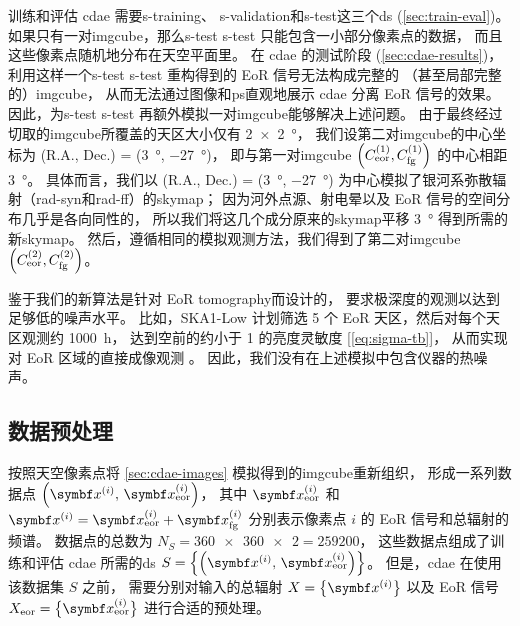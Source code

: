 训练和评估 \ac{cdae} 需要\acl{s-training}、
\acl{s-validation}和\acl{s-test}这三个\ac{ds} (\autoref{sec:train-eval})。
如果只有一对\ac{imgcube}，那么\acl{s-test} \ac{s-test} 只能包含一小部分像素点的数据，
而且这些像素点随机地分布在天空平面里。
在 \ac{cdae} 的测试阶段 (\autoref{sec:cdae-results})，
利用这样一个\acl{s-test} \ac{s-test} 重构得到的 EoR 信号无法构成完整的
（甚至局部完整的）\ac{imgcube}，
从而无法通过图像和\ac{ps}直观地展示 \ac{cdae} 分离 EoR 信号的效果。
因此，为\acl{s-test} \ac{s-test} 再额外模拟一对\ac{imgcube}能够解决上述问题。
由于最终经过切取的\ac{imgcube}所覆盖的天区大小仅有 \SI{2 x 2}{\degree}，
我们设第二对\ac{imgcube}的中心坐标为
(R.A., Dec.\@) = (\SI{3}{\degree}, \SI{-27}{\degree})，
即与第一对\ac{imgcube}
$\left( C_{\mathrm{eor}}^{(1)}, C_{\mathrm{fg}}^{(1)} \right)$
的中心相距 \SI{3}{\degree}。
具体而言，我们以 (R.A., Dec.\@) = (\SI{3}{\degree}, \SI{-27}{\degree})
为中心模拟了银河系弥散辐射（\ac{rad-syn}和\ac{rad-ff}）的\ac{skymap}；
因为河外点源、射电晕以及 EoR 信号的空间分布几乎是各向同性的，
所以我们将这几个成分原来的\ac{skymap}平移 \SI{3}{\degree} 得到所需的新\ac{skymap}。
然后，遵循相同的模拟观测方法，我们得到了第二对\ac{imgcube}
$\left( C_{\mathrm{eor}}^{(2)}, C_{\mathrm{fg}}^{(2)} \right)$。

鉴于我们的新算法是针对 EoR \ac{tomography}而设计的，
要求极深度的观测以达到足够低的噪声水平。
比如，SKA1-Low 计划筛选 5 个 EoR 天区，然后对每个天区观测约 \SI{1000}{\hour}，
达到空前的约小于 \SI{1}{\mK} 的亮度灵敏度 [\autoref{eq:sigma-tb}]，
从而实现对 EoR 区域的直接成像观测 \cite{mellema2013,mellema2015,koopmans2015}。
因此，我们没有在上述模拟中包含仪器的热噪声。

\subsection{数据预处理}
\label{sec:preprocessing}

按照天空像素点将 \autoref{sec:cdae-images} 模拟得到的\ac{imgcube}重新组织，
形成一系列数据点 $\left( \B{x}^{(i)}, \,\B{x}^{(i)}_{\R{eor}} \right)$，
其中 $\B{x}^{(i)}_{\R{eor}}$ 和
$\B{x}^{(i)} = \B{x}^{(i)}_{\R{eor}} + \B{x}^{(i)}_{\R{fg}}$
分别表示像素点 $i$ 的 EoR 信号和总辐射的频谱。
数据点的总数为 $N_S = \num{360x360 x 2} = \num{259200}$，
这些数据点组成了训练和评估 \ac{cdae} 所需的\ac{ds}
$S = \left\{ \left(\B{x}^{(i)}, \,\B{x}^{(i)}_{\R{eor}} \right) \right\}$。
但是，\ac{cdae} 在使用该数据集 $S$ 之前，
需要分别对输入的总辐射 $X = \big\{ \B{x}^{(i)} \big\}$
以及 EoR 信号 $X_{\R{eor}} = \big\{ \B{x}^{(i)}_{\R{eor}} \big\}$
进行合适的预处理。

